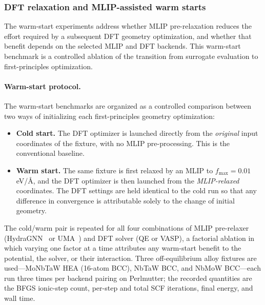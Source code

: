 \documentclass[11pt,a4paper]{article}
\def\ac#1{#1}%
\def\acs#1{#1}%
\begin{document}
\subsubsection{DFT relaxation and MLIP-assisted warm starts}
\label{sec:results:warmstart_setup}
The warm-start experiments address whether \ac{MLIP}
pre-relaxation reduces the effort required by a subsequent \ac{DFT} geometry
optimization, and whether that benefit depends on the selected \ac{MLIP} and
\ac{DFT} backends. This warm-start benchmark is a controlled
ablation of the transition from surrogate evaluation to first-principles
optimization.

\paragraph{Warm-start protocol.}
The warm-start benchmarks are organized as a controlled comparison between two
ways of initializing each first-principles geometry optimization:

\begin{itemize}
\item \textbf{Cold start.} The \ac{DFT} optimizer is launched directly from the
  \emph{original} input coordinates of the fixture, with no \ac{MLIP}
  pre-processing. This is the conventional baseline.
\item \textbf{Warm start.} The same fixture is first relaxed by an \ac{MLIP}
  to $f_\text{max} = 0.01$\,eV/\AA, and the \ac{DFT} optimizer is then launched
  from the \emph{\ac{MLIP}-relaxed} coordinates. The \ac{DFT} settings are held
  identical to the cold run so that any difference in convergence is
  attributable solely to the change of initial geometry.
\end{itemize}

The cold/warm pair is repeated for all four combinations of \ac{MLIP}
pre-relaxer (HydraGNN~\cite{hydragnn} or UMA~\cite{wood2025uma}) and \ac{DFT}
solver (\ac{QE} or \ac{VASP}), a factorial ablation in which varying one factor
at a time attributes any warm-start benefit to the potential, the solver, or
their interaction. Three off-equilibrium alloy fixtures are used---MoNbTaW
\ac{HEA} (16-atom BCC), NbTaW BCC, and NbMoW BCC---each run three times per
backend pairing on Perlmutter; the recorded quantities are the \ac{BFGS}
ionic-step count, per-step and total \ac{SCF} iterations, final energy, and wall
time.

\end{document}
